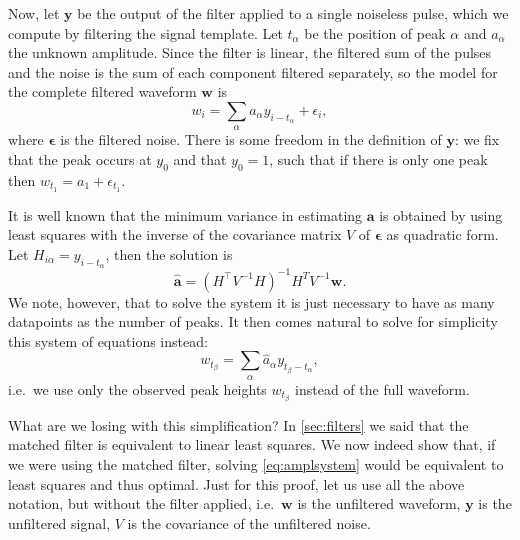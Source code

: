 \begin{figure}
    

    
\end{figure}

Now, let $\mathbf y$ be the output of the filter applied to a single noiseless
pulse, which we compute by filtering the signal template. Let $t_\alpha$ be the
position of peak $\alpha$ and $a_\alpha$ the unknown amplitude. Since the
filter is linear, the filtered sum of the pulses and the noise is the sum of
each component filtered separately, so the model for the complete filtered
waveform $\mathbf w$ is
%
\begin{equation}
    w_i = \sum_\alpha a_\alpha y_{i - t_\alpha} + \epsilon_i,
\end{equation}
%
where $\boldsymbol\epsilon$ is the filtered noise. There is some freedom in the
definition of $\mathbf y$: we fix that the peak occurs at $y_0$ and that $y_0 =
1$, such that if there is only one peak then $w_{t_1} = a_1 + \epsilon_{t_1}$.

It is well known that the minimum variance in estimating $\mathbf a$ is
obtained by using least squares with the inverse of the covariance matrix $V$
of $\boldsymbol\epsilon$ as quadratic form. Let $H_{i\alpha} = y_{i-t_\alpha}$,
then the solution is \cite[628]{zyla2020}
%
\begin{equation}
    \hat{\mathbf a} = (H^\top V^{-1} H)^{-1} H^T V^{-1} \mathbf w.
    \label{eq:lsq}
\end{equation}
%
We note, however, that to solve the system it is just necessary to have as many
datapoints as the number of peaks. It then comes natural to solve for
simplicity this system of equations instead:
%
\begin{equation}
    w_{t_\beta} = \sum_\alpha \hat a_\alpha y_{t_\beta - t_\alpha},
    \label{eq:amplsystem}
\end{equation}
%
i.e.\ we use only the observed peak heights $w_{t_\beta}$ instead of the full
waveform.

What are we losing with this simplification? In \autoref{sec:filters} we said
that the matched filter is equivalent to linear least squares. We now indeed
show that, if we were using the matched filter, solving \eqref{eq:amplsystem}
would be equivalent to least squares and thus optimal. Just for this proof, let
us use all the above notation, but without the filter applied, i.e.\ $\mathbf
w$ is the unfiltered waveform, $\mathbf y$ is the unfiltered signal, $V$ is the
covariance of the unfiltered noise.

